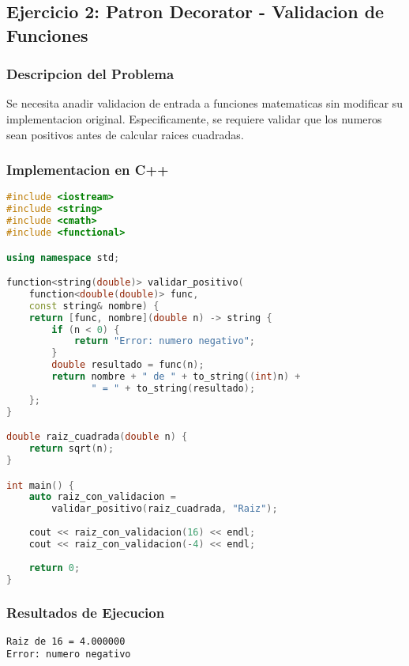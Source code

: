 \documentclass[11pt,a4paper]{article}
\begin{document}
\subsection{Ejercicio 2: Patron Decorator - Validacion de Funciones}

\subsubsection{Descripcion del Problema}

Se necesita anadir validacion de entrada a funciones matematicas sin modificar su implementacion original. Especificamente, se requiere validar que los numeros sean positivos antes de calcular raices cuadradas.

\subsubsection{Implementacion en C++}

\begin{lstlisting}[language=C++, caption=Sistema de Decorador con Validacion]
#include <iostream>
#include <string>
#include <cmath>
#include <functional>

using namespace std;

function<string(double)> validar_positivo(
    function<double(double)> func, 
    const string& nombre) {
    return [func, nombre](double n) -> string {
        if (n < 0) {
            return "Error: numero negativo";
        }
        double resultado = func(n);
        return nombre + " de " + to_string((int)n) + 
               " = " + to_string(resultado);
    };
}

double raiz_cuadrada(double n) {
    return sqrt(n);
}

int main() {
    auto raiz_con_validacion = 
        validar_positivo(raiz_cuadrada, "Raiz");
    
    cout << raiz_con_validacion(16) << endl;
    cout << raiz_con_validacion(-4) << endl;
    
    return 0;
}
\end{lstlisting}

\subsubsection{Resultados de Ejecucion}

\begin{verbatim}
Raiz de 16 = 4.000000
Error: numero negativo
\end{verbatim}
\end{document}
